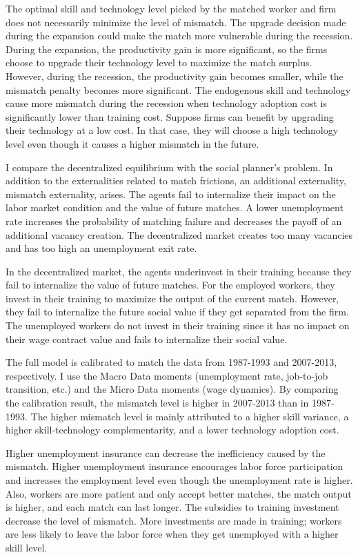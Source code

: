 \documentclass[12pt]{article}
\newcommand{\1}{\mathbb{1}}
\begin{document}
The optimal skill and technology level picked by the matched worker and firm does not necessarily minimize the level of mismatch. The upgrade decision made during the expansion could make the match more vulnerable during the recession. During the expansion, the productivity gain is more significant, so the firms choose to upgrade their technology level to maximize the match surplus. However, during the recession, the productivity gain becomes smaller, while the mismatch penalty becomes more significant. The endogenous skill and technology cause more mismatch during the recession when technology adoption cost is significantly lower than training cost. Suppose firms can benefit by upgrading their technology at a low cost. In that case, they will choose a high technology level even though it causes a higher mismatch in the future.  

I compare the decentralized equilibrium with the social planner's problem. In addition to the externalities related to match frictions, an additional externality, mismatch externality, arises. The agents fail to internalize their impact on the labor market condition and the value of future matches. A lower unemployment rate increases the probability of matching failure and decreases the payoff of an additional vacancy creation. The decentralized market creates too many vacancies and has too high an unemployment exit rate.  

In the decentralized market, the agents underinvest in their training because they fail to internalize the value of future matches. For the employed workers, they invest in their training to maximize the output of the current match. However, they fail to internalize the future social value if they get separated from the firm. The unemployed workers do not invest in their training since it has no impact on their wage contract value and fails to internalize their social value. 

The full model is calibrated to match the data from 1987-1993 and 2007-2013, respectively. I use the Macro Data moments (unemployment rate, job-to-job transition, etc.) and the Micro Data moments (wage dynamics). By comparing the calibration result, the mismatch level is higher in 2007-2013 than in 1987-1993. The higher mismatch level is mainly attributed to a higher skill variance, a higher skill-technology complementarity, and a lower technology adoption cost.  

Higher unemployment insurance can decrease the inefficiency caused by the mismatch. Higher unemployment insurance encourages labor force participation and increases the employment level even though the unemployment rate is higher.  Also, workers are more patient and only accept better matches, the match output is higher, and each match can last longer.  The subsidies to training investment decrease the level of mismatch. More investments are made in training; workers are less likely to leave the labor force when they get unemployed with a higher skill level. 
\end{document}
